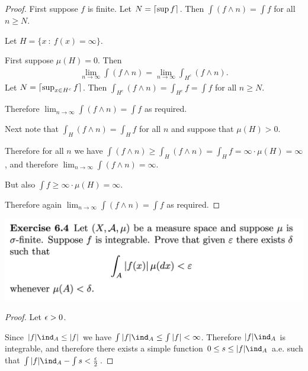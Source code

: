 \begin{proof}

  First suppose $f$ is finite. Let $N = \lceil\sup f\rceil$. Then $\int (f \land n) = \int f$ for all $n \geq N$.

  Let $H = \{x ~:~ f(x) = \infty\}$.

  First suppose $\mu(H) = 0$. Then
  \begin{align*}
    \lim_{n\to\infty} \int (f \land n) = \lim_{n\to\infty} \int_{H^c} (f \land n).
  \end{align*}
  Let $N = \lceil\sup_{x \in H^c} f\rceil$. Then $\int_{H^c} (f \land n) = \int_{H^c} f = \int f$ for
  all $n \geq N$.

  Therefore $\lim_{n\to\infty} \int (f \land n) = \int f$ as required.

  Next note that $\int_H (f \land n) = \int_H f$ for all $n$ and suppose that $\mu(H) > 0$.

  Therefore for all $n$ we
  have $\int (f \land n) \geq \int_H (f \land n) = \int_H f = \infty \cdot \mu(H) = \infty$, and
  therefore $\lim_{n\to\infty} \int (f \land n) = \infty$.

  But also $\int f \geq \infty \cdot \mu(H) = \infty$.

  Therefore again $\lim_{n\to\infty} \int (f \land n) = \int f$ as required.
\end{proof}

\newpage
\begin{mdframed}
\includegraphics[width=400pt]{img/analysis--berkeley-202a-hw07-610e.png}
\end{mdframed}

\begin{proof}
  Let $\epsilon > 0$.

  Since $|f|\ind_A \leq |f|$ we have $\int |f|\ind_A \leq \int |f| < \infty$. Therefore $|f|\ind_A$ is
  integrable, and therefore there exists a simple function $0 \leq s \leq |f|\ind_A$ a.e. such
  that $\int |f|\ind_A - \int s < \frac{\eps}{2}$.



\end{proof}

